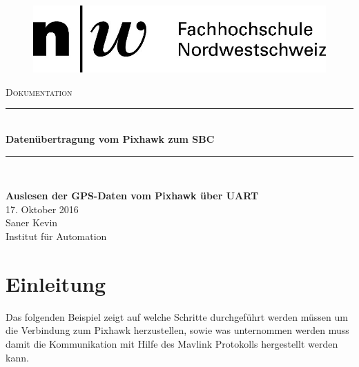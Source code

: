 \documentclass[12pt]{article} %
\begin{document}
	
	\begin{titlepage}
		
		\newcommand{\HRule}{\rule{\linewidth}{0.5mm}} %
		
		\centering %
		
		\begin{figure}[h] 
			\centering
			\includegraphics[width=.4\textwidth]{Logo-FHNW}
		\end{figure}
		
		\textsc{\Large Dokumentation}\\[0.5cm] %
		\begin{doublespace}
			\HRule \\[1cm]
			{ \huge \bfseries Datenübertragung vom Pixhawk zum SBC}\\[1cm] %
			\HRule \\[1cm]
		\end{doublespace}
		
		{\large \textbf{Auslesen der GPS-Daten vom Pixhawk über UART}}\\[1cm]

		{\large 17. Oktober 2016}\\[1cm] %
		
		{\large Saner Kevin}\\[1cm]
		{\large Institut für Automation}
		
		\vfill %
		
	\end{titlepage}
	
	\setcounter{page}{1}
	\pagestyle{fancy}
	\rfoot{\thepage}
	
	\section{Einleitung}
	Das folgenden Beispiel zeigt auf welche Schritte durchgeführt werden müssen um die Verbindung zum Pixhawk herzustellen, sowie was unternommen werden muss damit die Kommunikation mit Hilfe des Mavlink Protokolls hergestellt werden kann. 
\end{document}
